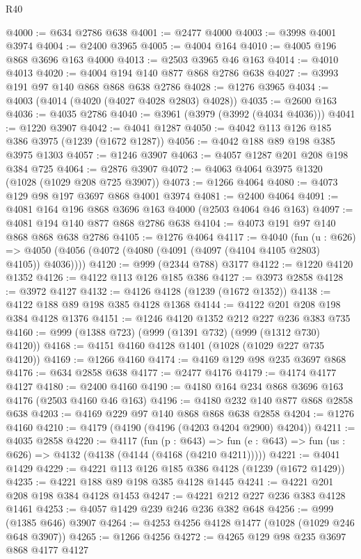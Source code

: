 \begin{lexlean}{R40}
\begin{coremodule}
@4000 := @634 @2786 @638
@4001 := @2477 @4000
@4003 := @3998 @4001 @3974
@4004 := @2400 @3965
@4005 := @4004 @164
@4010 := @4005 @196 @868 @3696 @163 @4000
@4013 := @2503 @3965 @46 @163
@4014 := @4010 @4013
@4020 := @4004 @194 @140 @877 @868 @2786 @638
@4027 := @3993 @191 @97 @140 @868 @868 @638 @2786
@4028 := @1276 @3965
@4034 := @4003 (@4014 (@4020 (@4027 @4028 @2803) @4028))
@4035 := @2600 @163
@4036 := @4035 @2786
@4040 := @3961 (@3979 (@3992 (@4034 @4036)))
@4041 := @1220 @3907
@4042 := @4041 @1287
@4050 := @4042 @113 @126 @185 @386 @3975 (@1239 (@1672 @1287))
@4056 := @4042 @188 @89 @198 @385 @3975 @1303
@4057 := @1246 @3907
@4063 := @4057 @1287 @201 @208 @198 @384 @725
@4064 := @2876 @3907
@4072 := @4063 @4064 @3975 @1320 (@1028 (@1029 @208 @725 @3907))
@4073 := @1266 @4064
@4080 := @4073 @129 @98 @197 @3697 @868 @4001 @3974
@4081 := @2400 @4064
@4091 := @4081 @164 @196 @868 @3696 @163 @4000 (@2503 @4064 @46 @163)
@4097 := @4081 @194 @140 @877 @868 @2786 @638
@4104 := @4073 @191 @97 @140 @868 @868 @638 @2786
@4105 := @1276 @4064
@4117 := @4040
    (fun (u : @626) =>
    @4050 (@4056 (@4072 (@4080 (@4091 (@4097 (@4104 @4105 @2803) @4105)) @4036))))
@4120 := @999 (@2344 @788) @3177
@4122 := @1220 @4120 @1352
@4126 := @4122 @113 @126 @185 @386
@4127 := @3973 @2858
@4128 := @3972 @4127
@4132 := @4126 @4128 (@1239 (@1672 @1352))
@4138 := @4122 @188 @89 @198 @385 @4128 @1368
@4144 := @4122 @201 @208 @198 @384 @4128 @1376
@4151 := @1246 @4120 @1352 @212 @227 @236 @383 @735
@4160 := @999 (@1388 @723) (@999 (@1391 @732) (@999 (@1312 @730) @4120))
@4168 := @4151 @4160 @4128 @1401 (@1028 (@1029 @227 @735 @4120))
@4169 := @1266 @4160
@4174 := @4169 @129 @98 @235 @3697 @868
@4176 := @634 @2858 @638
@4177 := @2477 @4176
@4179 := @4174 @4177 @4127
@4180 := @2400 @4160
@4190 := @4180 @164 @234 @868 @3696 @163 @4176 (@2503 @4160 @46 @163)
@4196 := @4180 @232 @140 @877 @868 @2858 @638
@4203 := @4169 @229 @97 @140 @868 @868 @638 @2858
@4204 := @1276 @4160
@4210 := @4179 (@4190 (@4196 (@4203 @4204 @2900) @4204))
@4211 := @4035 @2858
@4220 := @4117
    (fun (p : @643) =>
    fun (e : @643) => fun (us : @626) => @4132 (@4138 (@4144 (@4168 (@4210 @4211)))))
@4221 := @4041 @1429
@4229 := @4221 @113 @126 @185 @386 @4128 (@1239 (@1672 @1429))
@4235 := @4221 @188 @89 @198 @385 @4128 @1445
@4241 := @4221 @201 @208 @198 @384 @4128 @1453
@4247 := @4221 @212 @227 @236 @383 @4128 @1461
@4253 := @4057 @1429 @239 @246 @236 @382 @648
@4256 := @999 (@1385 @646) @3907
@4264 := @4253 @4256 @4128 @1477 (@1028 (@1029 @246 @648 @3907))
@4265 := @1266 @4256
@4272 := @4265 @129 @98 @235 @3697 @868 @4177 @4127

\end{coremodule}
\end{lexlean}

